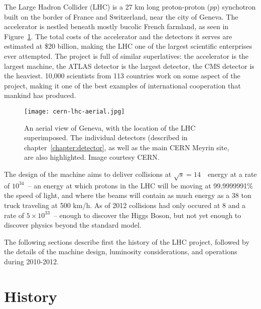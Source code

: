 \label{chapter:lhc}

The Large Hadron Collider (LHC) is a 27 km long proton-proton ($pp$) synchotron built on the border of France and Switzerland, near the city of Geneva. The accelerator is nestled beneath mostly bucolic French farmland, as seen in Figure~\ref{fig:lhc:cern-lhc-aerial}. The total costs of the accelerator and the detectors it serves are estimated at \$20 billion, making the LHC one of the largest scientific enterprises ever attempted.  The project is full of similar superlatives: the accelerator is the largest machine, the ATLAS detector is the largest detector, the CMS detector is the heaviest. 10,000 scientists from 113 countries work on some aspect of the project, making it one of the best examples of international cooperation that mankind has produced.


\begin{figure}
\centering
\texttt{[image: cern-lhc-aerial.jpg]}
\label{fig:lhc:cern-lhc-aerial}
\caption{An aerial view of Geneva, with the location of the LHC superimposed. The individual detectors (described in chapter~\ref{chapter:detector}, as well as the main CERN Meyrin site, are also highlighted. Image courtesy CERN.}
\end{figure}


The design of the machine aims to deliver collisions at $\sqrt{s} = 14$~\TeV~energy at a rate of $10^{34}$~\lumirate-- an energy at which protons in the LHC will be moving at 99.9999991$\%$ the speed of light, and where the beams will contain as much energy as a 38 ton truck traveling at 500 km/h.  As of 2012 collisions had only occured at 8 \TeV and a rate of $5\times10^{33}$~\lumirate-- enough to discover the Higgs Boson, but not yet enough to discover physics beyond the standard model.

The following sections describe first the history of the LHC project, followed by the details of the machine design, luminosity considerations, and operations during 2010-2012.

\section{History}
\label{lhc:history}

